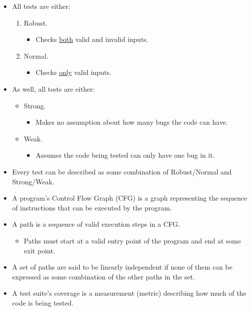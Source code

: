 \documentclass{article}
\begin{document}
\begin{itemize}
\begin{itemize}
\begin{itemize}
		\end{itemize}
	\end{itemize}
	\item All tests are either:
	\begin{enumerate}
		\item Robust.
		\begin{itemize}
			\item Checks \underline{both} valid and invalid inputs.
		\end{itemize}
		\item Normal.
		\begin{itemize}
			\item Checks \underline{only} valid inputs.
		\end{itemize}
	\end{enumerate}
	\item As well, all tests are either:
	\begin{itemize}
		\item Strong.
		\begin{itemize}
			\item Makes no assumption about how many bugs the code can have.
		\end{itemize}
		\item Weak.
		\begin{itemize}
			\item Assumes the code being tested can only have one bug in it.
		\end{itemize}
	\end{itemize}
	\item Every test can be described as some combination of Robust/Normal and Strong/Weak.
	\item A program's Control Flow Graph (CFG) is a graph representing the sequence of instructions that can be executed by the program.
	\item A path is a sequence of valid execution steps in a CFG.
	\begin{itemize}
		\item Paths must start at a valid entry point of the program and end at some exit point.
	\end{itemize}
	\item A set of paths are said to be linearly independent if none of them can be expressed as some combination of the other paths in the set.
	\item A test suite's coverage is a measurement (metric) describing how much of the code is being tested.
	\begin{itemize}

\end{itemize}
\end{itemize}
\end{document}
